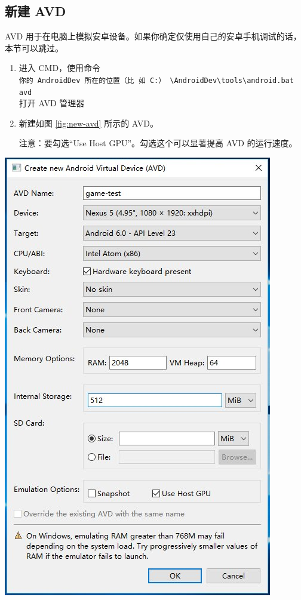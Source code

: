 \documentclass[a4paper, 10pt]{article}
\newcommand{\inlinecode}[1]{\colorbox{inlinecodecolor}{\texttt{#1}}}
\begin{document}
\subsection{新建 AVD}

AVD 用于在电脑上模拟安卓设备。如果你确定仅使用自己的安卓手机调试的话，
本节可以跳过。

\begin{enumerate}
\item 进入 CMD，使用命令 \\
  \inlinecode{你的 AndroidDev 所在的位置（比
    如 C:）
    \textbackslash{}AndroidDev\textbackslash{}tools\textbackslash{}android.bat
    avd} \\
  打开 AVD 管理器
\item 新建如图 \ref{fig:new-avd} 所示的 AVD。

  注意：要勾选``Use Host GPU''。勾选这个可以显著提高 AVD 的运行速度。
\end{enumerate}


\begin{center}
  \includegraphics*[width=.6\textwidth]{images/new-avd}
\end{center}
\end{document}
